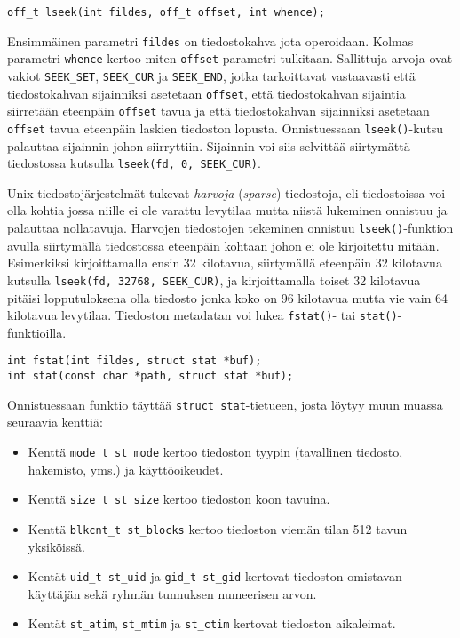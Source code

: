 \begin{verbatim}
off_t lseek(int fildes, off_t offset, int whence);
\end{verbatim}
Ensimmäinen parametri \texttt{fildes} on tiedostokahva jota operoidaan.
Kolmas parametri \texttt{whence} kertoo miten \texttt{offset}-parametri tulkitaan.
Sallittuja arvoja ovat vakiot \texttt{SEEK\_SET}, \texttt{SEEK\_CUR} ja \texttt{SEEK\_END},
jotka tarkoittavat vastaavasti että tiedostokahvan sijainniksi asetetaan \texttt{offset},
että tiedostokahvan sijaintia siirretään eteenpäin \texttt{offset} tavua ja
että tiedostokahvan sijainniksi asetetaan \texttt{offset} tavua eteenpäin laskien tiedoston lopusta.
Onnistuessaan \texttt{lseek()}-kutsu palauttaa sijainnin johon siirryttiin.
Sijainnin voi siis selvittää siirtymättä tiedostossa kutsulla \texttt{lseek(fd, 0, SEEK\_CUR)}.

Unix-tiedostojärjestelmät tukevat \emph{harvoja} (\emph{sparse}) tiedostoja,
eli tiedostoissa voi olla kohtia jossa niille ei ole varattu levytilaa mutta niistä lukeminen onnistuu ja palauttaa nollatavuja.
Harvojen tiedostojen tekeminen onnistuu \texttt{lseek()}-funktion avulla siirtymällä tiedostossa eteenpäin kohtaan johon ei ole kirjoitettu mitään.
Esimerkiksi kirjoittamalla ensin 32 kilotavua,
siirtymällä eteenpäin 32 kilotavua kutsulla \texttt{lseek(fd, 32768, SEEK\_CUR)},
ja kirjoittamalla toiset 32 kilotavua pitäisi lopputuloksena olla tiedosto jonka koko on 96 kilotavua mutta vie vain 64 kilotavua levytilaa.
Tiedoston metadatan voi lukea \texttt{fstat()}- tai \texttt{stat()}-funktioilla.

\begin{verbatim}
int fstat(int fildes, struct stat *buf);
int stat(const char *path, struct stat *buf);
\end{verbatim}

Onnistuessaan funktio täyttää \texttt{struct stat}-tietueen,
josta löytyy muun muassa seuraavia kenttiä:

\begin{itemize}
    \item Kenttä \texttt{mode\_t st\_mode} kertoo tiedoston tyypin (tavallinen tiedosto, hakemisto, yms.) ja käyttöoikeudet.
    \item Kenttä \texttt{size\_t st\_size} kertoo tiedoston koon tavuina.
    \item Kenttä \texttt{blkcnt\_t st\_blocks} kertoo tiedoston viemän tilan 512 tavun yksiköissä.
    \item Kentät \texttt{uid\_t st\_uid} ja \texttt{gid\_t st\_gid} kertovat tiedoston omistavan käyttäjän sekä ryhmän tunnuksen numeerisen arvon.
    \item Kentät \texttt{st\_atim}, \texttt{st\_mtim} ja \texttt{st\_ctim} kertovat tiedoston aikaleimat.
\end{itemize}

